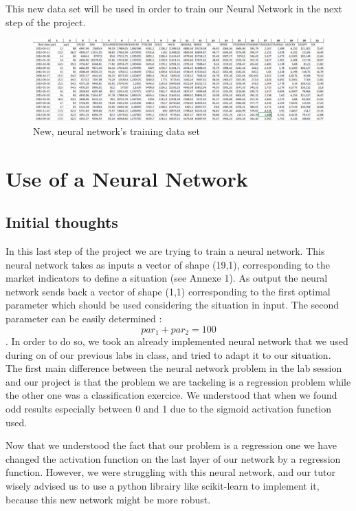 \documentclass[]{article}
\begin{document}
\vskip 0.5cm
This new data set will be used in order to train our Neural Network in the next step of the project. 

\begin{figure}[hbt!]
	\center{}
	\includegraphics[scale=0.35]{image/training_set.png}
	\caption{New, neural network's training data set}
\end{figure}


\section{Use of a Neural Network}
\subsection{Initial thoughts}
\vskip 0.5cm
In this last step of the project we are trying to train a neural network. This neural network takes as inputs a vector of shape (19,1), corresponding to the market indicators to define a situation (see Annexe 1). As output the neural network sends back a vector of shape (1,1) corresponding to the first optimal parameter which should be used considering the situation in input. The second parameter can be easily determined : \[par_{1} + par_{2} = 100\].
\vskip 0.5cm
In order to do so, we took an already implemented neural network that we used during on of our previous labs in class, and tried to adapt it to our situation. \\
The first main difference between the neural network problem in the lab session and our project is that the problem we are tackeling is a regression problem while the other one was a classification exercice. We understood that when we found odd results especially between 0 and 1 due to the sigmoid activation function used.

\vskip 0.5cm
Now that we understood the fact that our problem is a regression one we have changed the activation function on the last layer of our network by a regression function. However, we were struggling  with this neural network, and our tutor wisely advised us to use a python librairy like scikit-learn to implement it, because this new network might be more robust.
\end{document}
